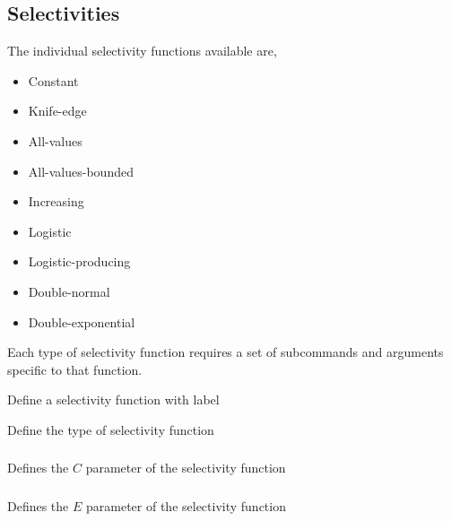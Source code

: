 \subsection{Selectivities}

The individual selectivity functions available are, 

\begin{itemize}
	\item Constant
	\item Knife-edge
	\item All-values
	\item All-values-bounded
	\item Increasing
	\item Logistic
	\item Logistic-producing
	\item Double-normal
	\item Double-exponential
\end{itemize}

Each type of selectivity function requires a set of subcommands and arguments specific to that function.

 {Define a selectivity function with label}

 {Define the type of selectivity function}

\subsubsection[Constant]{}

 {Defines the $C$ parameter of the selectivity function}

\subsubsection[Knife-edge]{}

 {Defines the $E$ parameter of the selectivity function}

\subsubsection[All-values]{}

